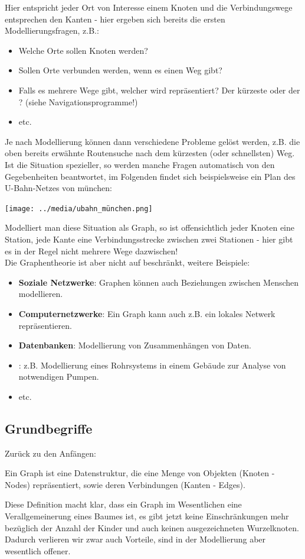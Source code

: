 \documentclass{article}
\begin{document}
Hier entspricht jeder Ort von Interesse einem Knoten und die Verbindungswege entsprechen den Kanten - hier ergeben sich bereits die ersten Modellierungsfragen, z.B.:
\begin{itemize}
    \item Welche Orte sollen Knoten werden?
    \item Sollen Orte verbunden werden, wenn es einen Weg gibt?
    \item Falls es mehrere Wege gibt, welcher wird repräsentiert? Der kürzeste oder der ? (siehe Navigationsprogramme!)
    \item etc.
\end{itemize}
Je nach Modellierung können dann verschiedene Probleme gelöst werden, z.B. die oben bereits erwähnte Routensuche nach dem kürzesten (oder schnellsten) Weg. \\
Ist die Situation spezieller, so werden manche Fragen automatisch von den Gegebenheiten beantwortet, im Folgenden findet sich beispielsweise ein Plan des U-Bahn-Netzes von münchen: 
\begin{center}
    \texttt{[image: ../media/ubahn\_münchen.png]}
\end{center}
Modelliert man diese Situation als Graph, so ist offensichtlich jeder Knoten eine Station, jede Kante eine Verbindungsstrecke zwischen zwei Stationen - hier gibt es in der Regel nicht mehrere Wege dazwischen! \\
Die Graphentheorie ist aber nicht auf  beschränkt, weitere Beispiele:
\begin{itemize}
    \item \textbf{Soziale Netzwerke}: Graphen können auch Beziehungen zwischen Menschen modellieren.
    \item \textbf{Computernetzwerke}: Ein Graph kann auch z.B. ein lokales Netwerk repräsentieren.
    \item \textbf{Datenbanken}: Modellierung von Zusammenhängen von Daten.
    \item \textbf{}: z.B. Modellierung eines Rohrsystems in einem Gebäude zur Analyse von notwendigen Pumpen.
    \item etc. 
\end{itemize}

\subsection{Grundbegriffe}

Zurück zu den Anfängen:
\begin{defi}
Ein Graph ist eine Datenstruktur, die eine Menge von Objekten (Knoten - Nodes) repräsentiert, sowie deren Verbindungen (Kanten - Edges).
\end{defi}
Diese Definition macht klar, dass ein Graph im Wesentlichen eine Verallgemeinerung eines Baumes ist, es gibt jetzt keine Einschränkungen mehr bezüglich der Anzahl der Kinder und auch keinen ausgezeichneten Wurzelknoten. Dadurch verlieren wir zwar auch Vorteile, sind in der Modellierung aber wesentlich offener. \\
\end{document}
